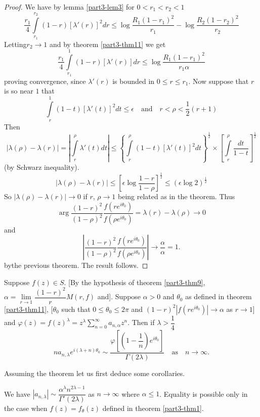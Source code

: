 \begin{proof}
We have by lemma \ref{part3-lem3} for $0<r_{1}<r_{2}<1$
$$
\frac{r_{1}}{4}\int\limits^{r_{2}}_{r_{1}}(1-r)[\lambda'(r)]^{2}dr\leq
\log \frac{R_{1}(1-r_{1})^{2}}{r_{1}}-\log \frac{R_{2}(1-r_{2})^{2}}{r_{2}}
$$
Letting\pageoriginale $r_{2}\to 1$ and by theorem \ref{part3-thm11} we
get
$$
\frac{r_{1}}{4}\int\limits^{1}_{r_{1}}(1-r)[\lambda'(r)]dr\leq\log\frac{R_{1}(1-r_{1})^{2}}{r_{1}\alpha} 
$$
proving convergence, since $\lambda'(r)$ is bounded in $0\leq r\leq
r_{1}$. Now suppose that $r$ is so near $1$ that
$$
\int\limits^{1}_{r}(1-t)[\lambda'(t)]^{2}dt\leq\epsilon\quad\text{and}\quad
r<\rho<\frac{1}{2}(r+1) 
$$
Then
$$
|\lambda(\rho)-\lambda(r)|=\left|\int\limits^{\rho}_{r}\lambda'(t)dt\right|\leq
\left\{\int\limits^{\rho}_{r}(1-t)[\lambda'(t)]^{2}dt\right\}^{\frac{1}{2}}\times \left[\int\limits^{\rho}_{r}\frac{dt}{1-t}\right]^{\frac{1}{2}}
$$
(by Schwarz inequality).
$$
|\lambda(\rho)-\lambda(r)|\leq \left[\epsilon\log
  \frac{1-r}{1-\rho}\right]^{\frac{1}{2}}\leq (\epsilon\log
2)^{\frac{1}{2}}
$$
So $|\lambda(\rho)-\lambda(r)|\to 0$ if $r$, $\rho\to 1$ being related
as in the theorem. Thus
$$
\arg \frac{(1-r)^{2}}{(1-\rho)^{2}}\frac{f(re^{i\theta_0})}{f(\rho
  e^{i\theta_{0}})}=\lambda(r)-\lambda(\rho)\to 0
$$
and
$$
\left|\frac{(1-r)^{2}}{(1-\rho)^{2}}\frac{f(re^{i\theta_{0}})}{f(\rho
  e^{i\theta_{0}})}\right|\to \frac{\alpha}{\alpha}=1.
$$
by\pageoriginale the previous theorem. The result follows.
\end{proof}

\begin{thm}\label{part3-thm13}
Suppose $f(z)\in S$. [By the hypothesis of theorem \ref{part3-thm9},
  $\alpha=\lim\limits_{r\to 1}\dfrac{(1-r)^{2}}{r}M(r,f)$
  and]. Suppose $\alpha>0$ and $\theta_{0}$ as defined in theorem
\ref{part3-thm11}, [$\theta_{0}$ such that $0\leq \theta_{0}\leq 2\pi$
  and $(1-r)^{2}|f(re^{i\theta_{0}})|\to\alpha$ as $r\to 1$] and
$\varphi(z)=f(z)^{\lambda}=z^{\lambda}\sum\limits^{\infty}_{n=0}a_{n,\alpha}z^{n}$. 
Then if $\lambda>\dfrac{1}{4}$
$$
na_{n,\lambda}e^{i(\lambda+n)\theta_{0}}\sim
\frac{\varphi\left[\left(1-\dfrac{1}{n}\right)e^{i\theta_{0}}\right]}{\Gamma(2\lambda)}\quad\text{as}\quad 
n\to \infty.
$$
\end{thm}

Assuming the theorem let us first deduce some corollaries.

\setcounter{cor}{0}
\begin{cor}\label{part3-coro1}
We have $|a_{n,\lambda}|\sim
\dfrac{\alpha^{\lambda}n^{2\lambda-1}}{\Gamma'(2\lambda)}$ as $n\to
\infty$ where $\alpha\leq 1$. Equality is possible only in the case
when $f(z)=f_{\theta}(z)$ defined in theorem \ref{part3-thm1}.
\end{cor}

